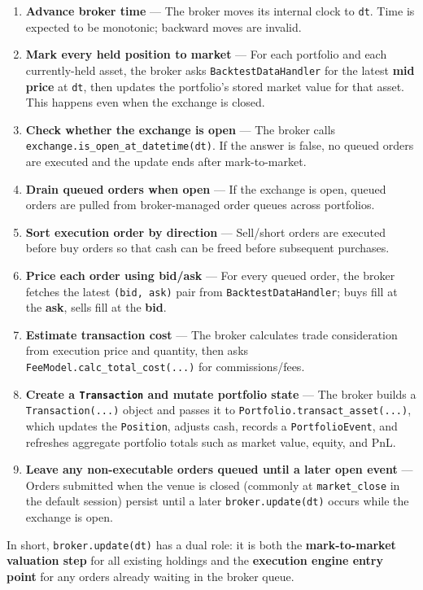 \documentclass[11pt]{article}
\begin{document}
\begin{enumerate}[leftmargin=*]
  \item \textbf{Advance broker time} --- The broker moves its internal clock to \texttt{dt}. Time is expected to be monotonic; backward moves are invalid.
  \item \textbf{Mark every held position to market} --- For each portfolio and each currently-held asset, the broker asks \texttt{BacktestDataHandler} for the latest \textbf{mid price} at \texttt{dt}, then updates the portfolio's stored market value for that asset. This happens even when the exchange is closed.
  \item \textbf{Check whether the exchange is open} --- The broker calls \texttt{exchange.is\_open\_at\_datetime(dt)}. If the answer is false, no queued orders are executed and the update ends after mark-to-market.
  \item \textbf{Drain queued orders when open} --- If the exchange is open, queued orders are pulled from broker-managed order queues across portfolios.
  \item \textbf{Sort execution order by direction} --- Sell/short orders are executed before buy orders so that cash can be freed before subsequent purchases.
  \item \textbf{Price each order using bid/ask} --- For every queued order, the broker fetches the latest \texttt{(bid, ask)} pair from \texttt{BacktestDataHandler}; buys fill at the \textbf{ask}, sells fill at the \textbf{bid}.
  \item \textbf{Estimate transaction cost} --- The broker calculates trade consideration from execution price and quantity, then asks \texttt{FeeModel.calc\_total\_cost(...)} for commissions/fees.
  \item \textbf{Create a \texttt{Transaction} and mutate portfolio state} --- The broker builds a \texttt{Transaction(...)} object and passes it to \texttt{Portfolio.transact\_asset(...)}, which updates the \texttt{Position}, adjusts cash, records a \texttt{PortfolioEvent}, and refreshes aggregate portfolio totals such as market value, equity, and PnL.
  \item \textbf{Leave any non-executable orders queued until a later open event} --- Orders submitted when the venue is closed (commonly at \texttt{market\_close} in the default session) persist until a later \texttt{broker.update(dt)} occurs while the exchange is open.
\end{enumerate}

In short, \texttt{broker.update(dt)} has a dual role: it is both the \textbf{mark-to-market valuation step} for all existing holdings and the \textbf{execution engine entry point} for any orders already waiting in the broker queue.
\end{document}
